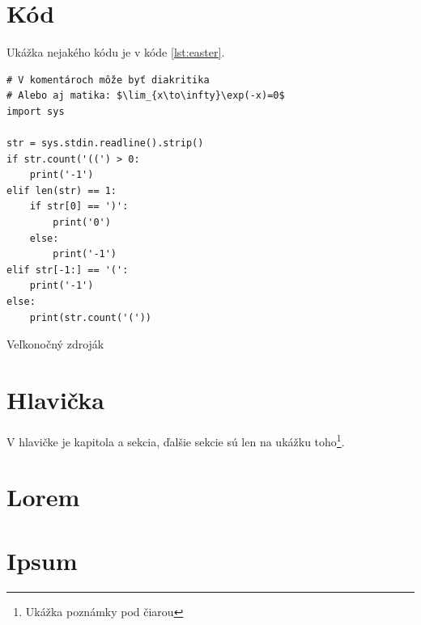 \section{Kód}
Ukážka nejakého kódu je v kóde \ref{lst:easter}.

\begin{listing}
\begin{verbatim}
# V komentároch môže byť diakritika
# Alebo aj matika: $\lim_{x\to\infty}\exp(-x)=0$
import sys

str = sys.stdin.readline().strip()
if str.count('((') > 0:
    print('-1')
elif len(str) == 1:
    if str[0] == ')':
        print('0')
    else:
        print('-1')
elif str[-1:] == '(':
    print('-1')
else:
    print(str.count('('))               
\end{verbatim}
\caption{Veľkonočný zdroják}
\label{lst:easter}
\end{listing}

\section{Hlavička}
V hlavičke je kapitola a sekcia, ďalšie sekcie sú len na ukážku toho\footnote{Ukážka poznámky pod čiarou}.

\section{Lorem}
\lipsum[1]

\section{Ipsum}
\lipsum[2]